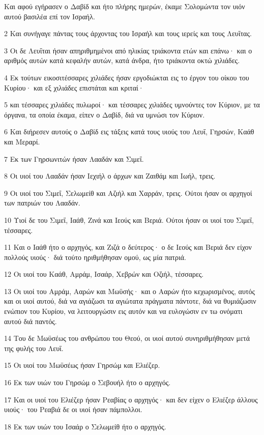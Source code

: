 \par Και αφού εγήρασεν ο Δαβίδ και ήτο πλήρης ημερών, έκαμε Σολομώντα τον υιόν αυτού βασιλέα επί τον Ισραήλ.
\par 2 Και συνήγαγε πάντας τους άρχοντας του Ισραήλ και τους ιερείς και τους Λευΐτας.
\par 3 Οι δε Λευΐται ήσαν απηριθμημένοι από ηλικίας τριάκοντα ετών και επάνω· και ο αριθμός αυτών κατά κεφαλήν αυτών, κατά άνδρα, ήτο τριάκοντα οκτώ χιλιάδες.
\par 4 Εκ τούτων εικοσιτέσσαρες χιλιάδες ήσαν εργοδιώκται εις το έργον του οίκου του Κυρίου· και εξ χιλιάδες επιστάται και κριταί·
\par 5 και τέσσαρες χιλιάδες πυλωροί· και τέσσαρες χιλιάδες υμνούντες τον Κύριον, με τα όργανα, τα οποία έκαμα, είπεν ο Δαβίδ, διά να υμνώσι τον Κύριον.
\par 6 Και διήρεσεν αυτούς ο Δαβίδ εις τάξεις κατά τους υιούς του Λευΐ, Γηρσών, Καάθ και Μεραρί.
\par 7 Εκ των Γηρσωνιτών ήσαν Λααδάν και Σιμεΐ.
\par 8 Οι υιοί του Λααδάν ήσαν Ιεχιήλ ο άρχων και Ζαιθάμ και Ιωήλ, τρεις.
\par 9 Οι υιοί του Σιμεΐ, Σελωμείθ και Αζιήλ και Χαρράν, τρεις. Ούτοι ήσαν οι αρχηγοί των πατριών του Λααδάν.
\par 10 Υιοί δε του Σιμεΐ, Ιαάθ, Ζινά και Ιεούς και Βεριά. Ούτοι ήσαν οι υιοί του Σιμεΐ, τέσσαρες.
\par 11 Και ο Ιαάθ ήτο ο αρχηγός, και Ζιζά ο δεύτερος· ο δε Ιεούς και Βεριά δεν είχον πολλούς υιούς· διά τούτο ηριθμήθησαν ομού, ως μία πατριά.
\par 12 Οι υιοί του Καάθ, Αμράμ, Ισαάρ, Χεβρών και Οζιήλ, τέσσαρες.
\par 13 Οι υιοί του Αμράμ, Ααρών και Μωϋσής· και ο Ααρών ήτο κεχωρισμένος, αυτός και οι υιοί αυτού, διά να αγιάζωσι τα αγιώτατα πράγματα πάντοτε, διά να θυμιάζωσιν ενώπιον του Κυρίου, να λειτουργώσιν εις αυτόν και να ευλογώσιν εν τω ονόματι αυτού διά παντός.
\par 14 Του δε Μωϋσέως του ανθρώπου του Θεού, οι υιοί αυτού συνηριθμήθησαν μετά της φυλής του Λευΐ.
\par 15 Οι υιοί του Μωϋσέως ήσαν Γηρσώμ και Ελιέζερ.
\par 16 Εκ των υιών του Γηρσώμ ο Σεβουήλ ήτο ο αρχηγός.
\par 17 Και οι υιοί του Ελιέζερ ήσαν Ρεαβίας ο αρχηγός· και δεν είχεν ο Ελιέζερ άλλους υιούς· του Ρεαβιά δε οι υιοί ήσαν πάμπολλοι.
\par 18 Εκ των υιών του Ισαάρ ο Σελωμείθ ήτο ο αρχηγός.
